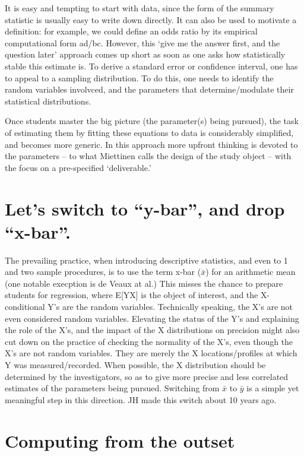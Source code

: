 \documentclass[]{book}
\begin{document}
It is easy and tempting to start with data, since the form of the summary statistic is usually easy to write down directly. It can also be used to motivate a definition: for example, we could define an odds ratio by its empirical computational form ad/bc. However, this `give me the answer first, and the question later' approach comes up short as soon as one asks how statistically stable this estimate is. To derive a standard error or confidence interval, one has to appeal to a sampling distribution. To do this, one needs to identify the random variables involvced, and the parameters that determine/modulate their statistical distributions.

Once students master the big picture (the parameter(s) being pursued), the task of estimating them by fitting these equations to data is considerably simplified, and becomes more generic. In this approach more upfront thinking is devoted to the parameters -- to what Miettinen calls the design of the study object -- with the focus on a pre-specified `deliverable.'

\hypertarget{lets-switch-to-y-bar-and-drop-x-bar.}{%
\section{Let's switch to ``y-bar'', and drop ``x-bar''.}\label{lets-switch-to-y-bar-and-drop-x-bar.}}

The prevailing practice, when introducing descriptive statistics, and even to 1 and two sample procedures, is to use the term x-bar (\(\bar{x}\)) for an arithmetic mean (one notable execption is de Veaux at al.) This misses the chance to prepare students for regression, where E{[}Y\textbar{}X{]} is the object of interest, and the X-conditional Y's are the random variables. Technically speaking, the X's are not even considered random variables. Elevating the status of the Y's and explaining the role of the X's, and the impact of the X distributions on precision might also cut down on the practice of checking the normality of the X's, even though the X's are not random variables. They are merely the X locations/profiles at which Y was measured/recorded. When possible, the X distribution should be determined by the investigators, so as to give more precise and less correlated estimates of the parameters being pursued. Switching from \(\bar{x}\) to \(\bar{y}\) is a simple yet meaningful step in this direction. JH made this switch about 10 years ago.

\hypertarget{computing-from-the-outset}{%
\section{Computing from the outset}\label{computing-from-the-outset}}
\end{document}
